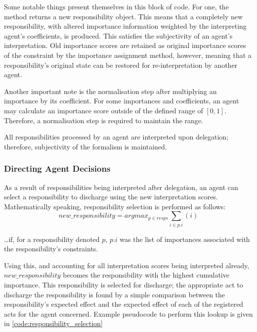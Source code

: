 Some notable things present themselves in this block of code. For one, the method returns a new responsibility object. This means that a completely new responsibility, with altered importance information weighted by the interpreting agent's coefficients, is produced. This satisfies the subjectivity of an agent's interpretation. Old importance scores are retained as original importance scores of the constraint by the importance assignment method, however, meaning that a responsibility's original state can be restored for re-interpretation by another agent.\par

Another important note is the normalisation step after multiplying an importance by its coefficient. For some importances and coefficients, an agent may calculate an importance score outside of the defined range of \([0,1]\). Therefore, a normalisation step is required to maintain the range.\par

All responsibilities processed by an agent are interpreted upon delegation; therefore, subjectivity of the formalism is maintained.\par

\subsubsection{Directing Agent Decisions}  %
As a result of responsibilities being interpreted after delegation, an agent can select a responsibility to discharge using the new interpretation scores. Mathematically speaking, responsibility selection is performed as follows: \[new\_responsibility = argmax_{p \in resps} {\sum_{i \in p.i}(i)}\]

\ldots{}if, for a responsibility denoted \(p\), \(p.i\) was the list of importances associated with the responsibility's constraints.\par

Using this, and accounting for all interpretation scores being interpreted already, \(new\_responsibility\) becomes the responsibility with the highest cumulative importance. This responsibility is selected for discharge; the appropriate act to discharge the responsibility is found by a simple comparison between the responsibility's expected effect and the expected effect of each of the registered acts for the agent concerned. Example pseudocode to perform this lookup is given in \cref{code:responsibility_selection}

